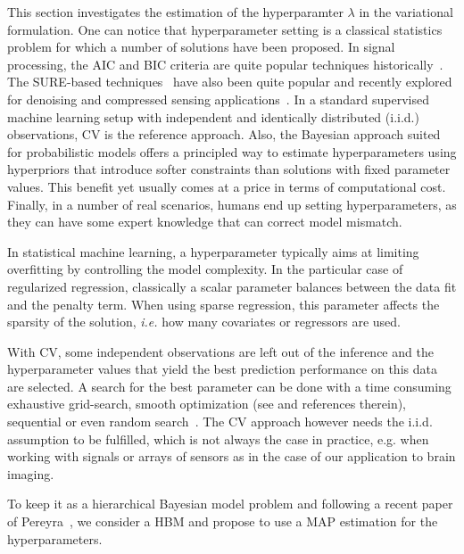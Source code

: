This section investigates the estimation of the hyperparamter $\lambda$ in the variational formulation. One can notice that hyperparameter setting is a classical statistics problem for which a number of solutions have been proposed. In signal processing, the \ac{AIC} and \ac{BIC} criteria are quite popular techniques historically~\cite{schwarz1978estimating}. The SURE-based techniques~\cite{stein1981estimation} have also been quite popular and recently explored for denoising and compressed sensing applications~\cite{luisier2007new, guo2015near}. In a standard supervised machine learning setup with independent and identically distributed (i.i.d.) observations, \ac{CV} is the reference approach. 
Also, the Bayesian approach suited for probabilistic models offers a principled way to estimate hyperparameters using hyperpriors that introduce softer constraints than solutions with fixed parameter values. This benefit yet usually comes at a price in terms of computational cost. Finally, in a number of real scenarios, humans end up setting hyperparameters, as they can have some expert knowledge that can correct model mismatch.

In statistical machine learning, a hyperparameter typically aims at limiting overfitting by controlling the model complexity. In the particular case of regularized regression, classically a scalar parameter balances between the data fit and the penalty term. When using sparse regression, this parameter affects the sparsity of the solution, \emph{i.e.} how many covariates or regressors are used.

With \ac{CV}, some independent observations are left out of the inference and the
hyperparameter values that yield the best prediction performance on this data are selected. A search for the best parameter can be done with a time consuming exhaustive grid-search, smooth optimization (see \cite{pedregosa2016hyperparameter} and references therein), sequential or even random search~\cite{bergstra2011algorithms, bergstra2012random}. The \ac{CV} approach however needs the i.i.d. assumption to be fulfilled, which is not always the case in practice, e.g. when working with signals or arrays of sensors as in the case of our application to brain imaging.

To keep it as a hierarchical Bayesian model problem and following a recent paper of Pereyra~\cite{Figueiredo}, we consider a \ac{HBM} and propose to use a \ac{MAP} estimation for the hyperparameters.

